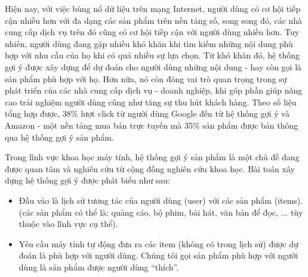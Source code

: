 


Hiện nay, với việc bùng nổ dữ liệu trên mạng Internet, người dùng có cơ hội tiếp cận
nhiều hơn với đa dạng các sản phẩm trên nền tảng số, song song đó,
các nhà cung cấp dịch vụ trên đó cũng có cơ hội tiếp cận với người dùng nhiều hơn. %
Tuy nhiên, người dùng đang gặp nhiều khó khăn khi tìm kiếm những nội dung phù hợp với nhu cầu của họ khi có quá nhiều sự lựa chọn.
Từ khó khăn đó, hệ thống gợi ý được xây dựng để dự đoán cho người dùng những nội dung - hay còn gọi là sản phẩm phù hợp với họ.
Hơn nữa, nó còn đóng vai trò quan trọng trong sự phát triển của các nhà cung cấp dịch vụ - doanh nghiệp,
khi góp phần giúp nâng cao trải nghiệm người dùng cũng như tăng sự thu hút khách hàng. Theo số liệu tổng hợp được, 
38\% lượt click từ người dùng Google đến từ hệ thống gợi ý và 
Amazon - một nền tảng mua bán trực tuyến mà 35\% sản phẩm được bán thông qua hệ thống gợi ý sản phẩm.

Trong lĩnh vực khoa học máy tính, hệ thống gợi ý sản phẩm là một chủ đề 
đang được quan tâm và nghiên cứu từ cộng đồng nghiên cứu khoa học.
Bài toán xây dựng hệ thống gợi ý được phát biểu như sau:
\begin{itemize}
    \item Đầu vào là lịch sử tương tác của người dùng (user) với các sản phẩm (items). 
    (các sản phẩm có thể là: quảng cáo, bộ phim, bài hát, văn bản để đọc, ... tùy thuộc vào lĩnh vực cụ thể).
    \item Yêu cầu máy tính tự động đưa ra các item (không có trong lịch sử) được dự đoán là phù hợp với người dùng.
    Chúng tôi gọi sản phẩm phù hợp với người dùng là sản phẩm được người dùng ``thích''.
\end{itemize}

